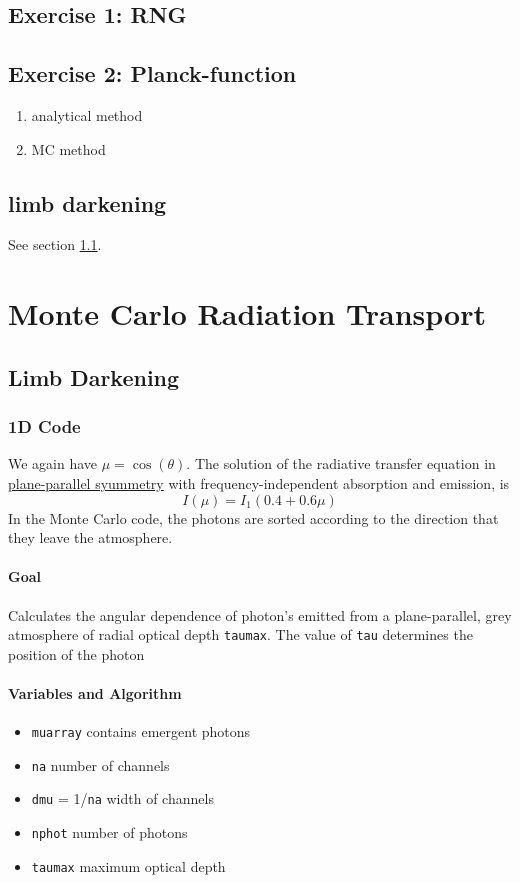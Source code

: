 \documentclass[10pt,a4paper]{article}
\begin{document}
\newpage
\subsection{Exercise 1: RNG}
\subsection{Exercise 2: Planck-function}
\begin{enumerate}
\item analytical method
\item MC method
\end{enumerate}
\subsection{limb darkening}
See section \ref{limb_darkening_discussion}.


\newpage
\section{Monte Carlo Radiation Transport}
\subsection{Limb Darkening}
\label{limb_darkening_discussion}

\subsubsection{1D Code}
We again have $\mu = \cos(\theta)$. The solution of the radiative transfer equation in \underline{plane-parallel syummetry} with frequency-independent absorption and emission, is 
\begin{equation}
I(\mu) = I_1 (0.4 + 0.6\mu)
\end{equation}
In the Monte Carlo code, the photons are sorted according to the direction that they leave the atmosphere.

\paragraph{Goal}
Calculates the angular dependence of photon's emitted from a plane-parallel, grey atmosphere of radial optical depth \texttt{taumax}. The value of \texttt{tau} determines the position of the photon

\paragraph{Variables and Algorithm}
\begin{itemize}
\item \texttt{muarray} contains emergent photons
\item \texttt{na} number of channels
\item \texttt{dmu} = 1/\texttt{na} width of channels
\item \texttt{nphot} number of photons
\item \texttt{taumax} maximum optical depth
\end{itemize}
\end{document}
